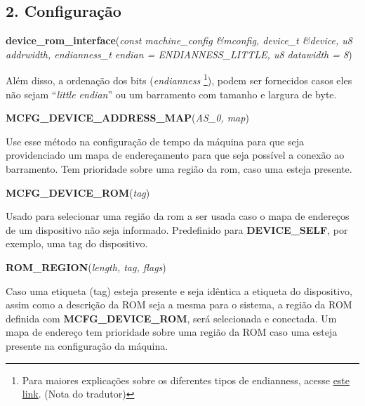 \documentclass[letterpaper,10pt,brazil]{sphinxmanual}
\begin{document}
\subsection{2. Configuração}
\label{techspecs/device_rom_interface:configuracao}
\begin{DUlineblock}{0em}
\item[] \textbf{device\_rom\_interface}(\emph{const machine\_config \&mconfig, device\_t \&device, u8 addrwidth, endianness\_t endian = ENDIANNESS\_LITTLE, u8 datawidth = 8})
\end{DUlineblock}

Além disso, a ordenação dos bits (\emph{endianness} \footnote[1]{\sphinxAtStartFootnote%
Para maiores explicações sobre os diferentes tipos de endianness, acesse \href{http://carlosdelfino.eti.br/programacao/cplusplus/Diferencas\_entre\_BigEndian\_Little\_Endian\_e\_Bit\_Endianness/}{este link}. (Nota do tradutor)
}), podem ser
fornecidos casos eles não sejam ``\emph{little endian}'' ou um barramento com
tamanho e largura de byte.

\begin{DUlineblock}{0em}
\item[] \textbf{MCFG\_DEVICE\_ADDRESS\_MAP}(\emph{AS\_0, map})
\end{DUlineblock}

Use esse método na configuração de tempo da máquina para que seja
providenciado um mapa de endereçamento para que seja possível a conexão
ao barramento.
Tem prioridade sobre uma região da rom, caso uma esteja presente.

\begin{DUlineblock}{0em}
\item[] \textbf{MCFG\_DEVICE\_ROM}(\emph{tag})
\end{DUlineblock}

Usado para selecionar uma região da rom a ser usada caso o mapa
de endereços de um dispositivo não seja informado. Predefinido para
\textbf{DEVICE\_SELF}, por exemplo, uma tag do dispositivo.

\begin{DUlineblock}{0em}
\item[] \textbf{ROM\_REGION}(\emph{length, tag, flags})
\end{DUlineblock}

Caso uma etiqueta (tag) esteja presente e seja idêntica a etiqueta do
dispositivo, assim como a descrição da ROM seja a mesma para o sistema,
a região da ROM definida com \textbf{MCFG\_DEVICE\_ROM}, será selecionada e
conectada. Um mapa de endereço tem prioridade sobre uma região da ROM
caso uma esteja presente na configuração da máquina.
\end{document}
